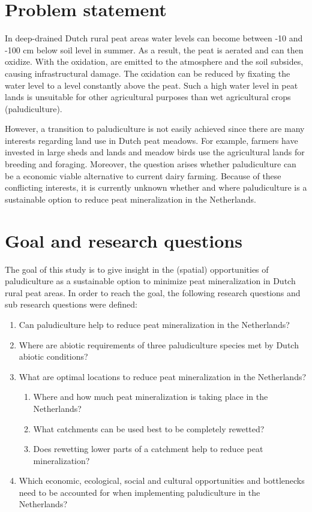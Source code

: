 \documentclass[a4paper,12pt]{scrbook}
\begin{document}
\section{Problem statement}
In deep-drained Dutch rural peat areas water levels can become between -10 and -100 cm below soil level in summer. As a result, the peat is aerated and can then oxidize. With the oxidation,  are emitted to the atmosphere and the soil subsides, causing infrastructural damage. The oxidation can be reduced by fixating the water level to a level constantly above the peat. Such a high water level in peat lands is unsuitable for other agricultural purposes than wet agricultural crops (paludiculture). 

However, a transition to paludiculture is not easily achieved since there are many interests regarding land use in Dutch peat meadows. For example, farmers have invested in large sheds and lands and meadow birds use the agricultural lands for breeding and foraging. Moreover, the question arises whether paludiculture can be a economic viable alternative to current dairy farming. Because of these conflicting interests, it is currently unknown whether and where paludiculture is a sustainable option to reduce peat mineralization in the Netherlands. 

\section{Goal and research questions}
The goal of this study is to give insight in the (spatial) opportunities of paludiculture as a sustainable option to minimize peat mineralization in Dutch rural peat areas. In order to reach the goal, the following research questions and sub research questions were defined:

\begin{enumerate}
\item \label{rq:pallit} {Can paludiculture help to reduce peat mineralization in the Netherlands?}
\item \label{rq:abiot} {Where are abiotic requirements of three paludiculture species met by Dutch abiotic conditions?}
\item \label{rq:gisoptloc} {What are optimal locations to reduce peat mineralization in the Netherlands?}
\begin{enumerate}
\item \label{rqsub:peatmineral} {Where and how much peat mineralization is taking place in the Netherlands?}
\item \label{rqsub:catchpeat} {What catchments can be used best to be completely rewetted?}
\item \label{rqsub:catchheigth} {Does rewetting lower parts of a catchment help to reduce peat mineralization?}
\end{enumerate}
\label{rq:sust}\item{Which economic, ecological, social and cultural opportunities and bottlenecks need to be accounted for when implementing paludiculture in the Netherlands?}
\end{enumerate}
\end{document}
